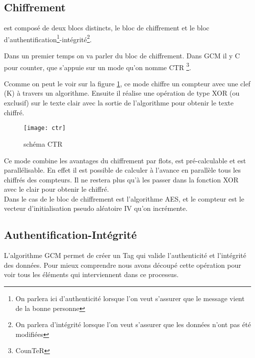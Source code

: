 \subsection{Chiffrement}

\aes est composé de deux blocs distincts, le bloc de chiffrement et le bloc d'authentification\footnote{On parlera ici d'authenticité lorsque l'on veut s'assurer que le message vient de la bonne personne}-intégrité\footnote{On parlera d'intégrité lorsque l'on veut s'assurer que les données n'ont pas été modifiées}.

Dans un premier temps on va parler du bloc de chiffrement. Dans GCM il y C pour \og counter\fg{}, \cad que \aes s'appuie sur un mode qu'on nomme CTR \footnote{CounTeR}.

Ccomme on peut le voir sur la figure \ref{schema CTR}, ce mode chiffre un compteur avec une clef (K) à travers un algorithme. Ensuite il réalise une opération de type XOR (ou exclusif) sur le texte clair avec la sortie de l'algorithme pour obtenir le texte chiffré.

\begin{figure}[!h]
  \centering
  \texttt{[image: ctr]}
  \caption{schéma CTR \cite{wiki}}
  \label{schema CTR}
\end{figure}

 Ce mode combine les avantages du chiffrement par flots, est pré-calculable et est parallélisable. En effet il est possible de calculer à l'avance en parallèle tous les chiffrés des compteurs. Il ne restera plus qu'à les passer dans la fonction XOR avec le clair pour obtenir le chiffré.
 ~\\

 Dans le cas de \aes le bloc de chiffrement est l'algorithme AES, et le compteur est le vecteur d'initialisation pseudo aléatoire IV qu'on incrémente.


\subsection{Authentification-Intégrité}

L'algorithme GCM permet de créer un Tag qui valide l'authenticité et l'intégrité des données. Pour mieux comprendre nous avons découpé cette opération pour voir tous les éléments qui interviennent dans ce processus.

